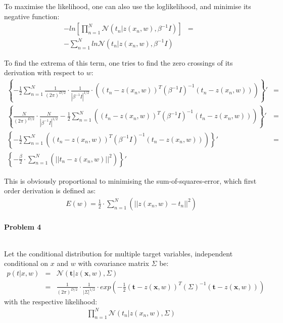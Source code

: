 \documentclass{article}
\renewcommand{\Vec}[1]{\ensuremath{\mathbf{#1}}}
\begin{document}
To maximise the likelihood, one can also use the loglikelihood, and minimise its negative function:
\begin{eqnarray}
-ln\left[ \prod_{n=1}^N\mathcal{N}(t_n | z(x_n,w), \beta^{-1}I) \right] &=&\\
-\sum_{n=1}^N ln\mathcal{N}(t_n | z(x_n,w), \beta^{-1}I)
\end{eqnarray}

To find the extrema of this term, one tries to find the zero crossings of its derivation with respect to $w$:
\begin{eqnarray}
\left\{ -\frac{1}{2}\sum_{n=1}^N \frac{1}{(2\pi)^{D/2}}\cdot \frac{1}{|\beta^{-1}I |^{1/2}}\cdot \left( (t_n-z(x_n,w))^T(\beta^{-1}I)^{-1}(t_n-z(x_n,w))\right)\right\}' &=& \\
\left\{ \frac{N}{(2\pi)^{D/2}}\cdot \frac{N}{|\beta^{-1}I |^{1/2}} -\frac{1}{2}\sum_{n=1}^N \left( (t_n-z(x_n,w))^T(\beta^{-1}I)^{-1}(t_n-z(x_n,w))\right)\right\}' &=& \\
\left\{ -\frac{1}{2} \sum_{n=1}^N \left((t_n-z(x_n,w))^T(\beta^{-1}I)^{-1}(t_n-z(x_n,w))\right)\right\}' &=& \\
\left\{ -\frac{\beta}{2} \cdot \sum_{n=1}^N \left( ||t_n-z(x_n,w)||^2 \right) \right\}'
\end{eqnarray}

This is obviously proportional to minimising the sum-of-squares-error, which first order derivation is defined as:
\begin{eqnarray}
E(w) = \frac{1}{2} \cdot \sum_{n=1}^N \left( ||z(x_n,w)-t_n||^2 \right)
\end{eqnarray}

\paragraph*{Problem 4}
$\;$ 

Let the conditional distribution for multiple target variables, independent conditional on $x$ and $w$ with covariance matrix $\Sigma$ be:
\begin{eqnarray}
p(t | x,w) &=& \mathcal{N}(\Vec{t} | z(\Vec{x},w), \Sigma)\\
&=& \frac{1}{(2\pi)^{D/2}}\cdot \frac{1}{|\Sigma |^{1/2}}\cdot exp \left( -\frac{1}{2} (\Vec{t}-z(\Vec{x},w))^T(\Sigma)^{-1}(\Vec{t}-z(\Vec{x},w))\right)
\end{eqnarray}
with the respective likelihood:
\begin{eqnarray}
\prod_{n=1}^N\mathcal{N}(t_n | z(x_n,w), \Sigma)
\end{eqnarray}
\end{document}
